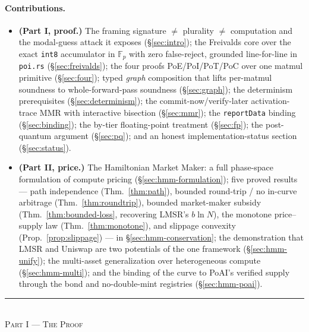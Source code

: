 \documentclass[11pt]{article}
\newcommand{\Fp}{\ensuremath{\mathbb{F}_p}}
\newcommand{\code}[1]{\texttt{#1}}
\begin{document}
\paragraph{Contributions.}
\begin{itemize}[leftmargin=1.4em]
  \item \textbf{(Part I, proof.)} The framing signature $\neq$ plurality $\neq$
        computation and the modal-guess attack it exposes (\S\ref{sec:intro}); the
        Freivalds core over the exact \code{int8} accumulator in $\Fp$ with zero
        false-reject, grounded line-for-line in \code{poi.rs}
        (\S\ref{sec:freivalds}); the four proofs PoE/PoI/PoT/PoC over one matmul
        primitive (\S\ref{sec:four}); typed \emph{graph} composition that lifts
        per-matmul soundness to whole-forward-pass soundness
        (\S\ref{sec:graph}); the determinism prerequisites
        (\S\ref{sec:determinism}); the commit-now/verify-later activation-trace MMR
        with interactive bisection (\S\ref{sec:mmr}); the \code{reportData} binding
        (\S\ref{sec:binding}); the by-tier floating-point treatment
        (\S\ref{sec:fp}); the post-quantum argument (\S\ref{sec:pq}); and an honest
        implementation-status section (\S\ref{sec:status}).
  \item \textbf{(Part II, price.)} The Hamiltonian Market Maker:
        a full phase-space formulation of compute pricing
        (\S\ref{sec:hmm-formulation}); five proved results --- path
        independence (Thm.~\ref{thm:path}), bounded round-trip / no in-curve
        arbitrage (Thm.~\ref{thm:roundtrip}), bounded market-maker subsidy
        (Thm.~\ref{thm:bounded-loss}, recovering LMSR's $b\ln N$), the monotone
        price--supply law (Thm.~\ref{thm:monotone}), and slippage convexity
        (Prop.~\ref{prop:slippage}) --- in \S\ref{sec:hmm-conservation};
        the demonstration that LMSR and Uniswap are two potentials of the one
        framework (\S\ref{sec:hmm-unify}); the multi-asset generalization over
        heterogeneous compute (\S\ref{sec:hmm-multi}); and the binding of the curve
        to PoAI's verified supply through the bond and no-double-mint registries
        (\S\ref{sec:hmm-poai}).
\end{itemize}

\begin{center}\rule{0.5\linewidth}{0.4pt}\\[-0.2em]\textsc{Part I --- The Proof}\end{center}

\end{document}
